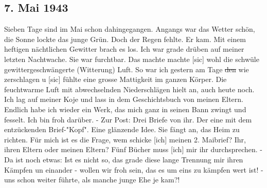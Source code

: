 \subsection{7. Mai 1943}

Sieben Tage sind im Mai schon dahingegangen.
Angangs war das Wetter sch\"{o}n, die Sonne lockte das junge Gr\"{u}n.
Doch der Regen fehlte.
Er kam.
Mit einem heftigen n\"{a}chtlichen Gewitter brach es los.
Ich war grade dr\"{u}ben auf meiner letzten Nachtwache.
Sie war furchtbar.
Das machte machte{\color{red} [sic] } wohl die schw\"{u}le gewittergeschw\"{a}ngerte (Witterung) Luft.
So war ich gestern am Tage \st{den} wie zerschlagen u{\color{red} [sic] } f\"{u}hlte eine grosse Mattigkeit im ganzen K\"{o}rper.
Die feuchtwarme Luft mit abwechselnden Niederschl\"{a}gen hielt an, auch heute noch.
Ich lag auf meiner Koje und lass in dem Geschichtsbuch von meinen Eltern.
Endlich habe ich wieder ein Werk, das mich ganz in seinen Bann zwingt und fesselt.
Ich bin froh dar\"{u}ber.
- Zur Post: Drei Briefe von ihr.
Der eine mit dem entz\"{u}ckenden Brief-"Kopf".
Eine gl\"{a}nzende Idee.
Sie f\"{a}ngt an, das Heim zu richten.
F\"{u}r mich ist es die Frage, wem schicke {\color{red} [ich] } meinen 2. Maibrief?
Ihr, ihren Eltern oder meinen Eltern?
F\"{u}nf B\"{u}cher muss {\color{red} [ich] } mir ihr durchsprechen.
- Da ist noch etwas: Ist es nicht so, das grade diese lange Trennung mir ihren K\"{a}mpfen un einander - wollen wir froh sein, das es um eins zu k\"{a}mpfen wert ist! - uns schon weiter f\"{u}hrte, als manche junge Ehe je kam?!

\clearpage
